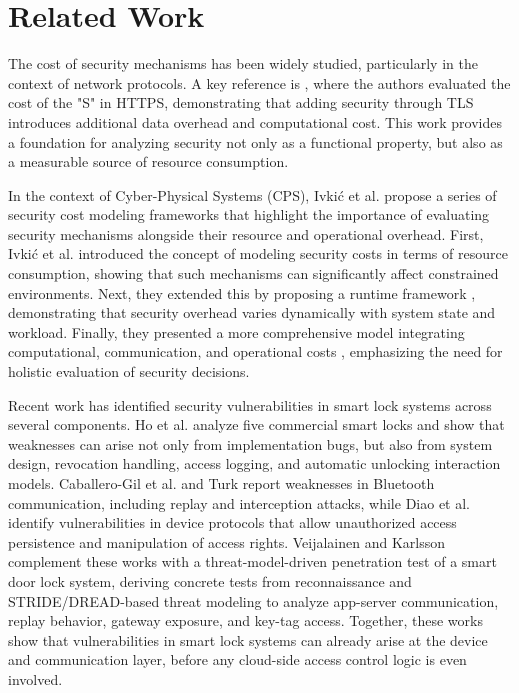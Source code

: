 \section{Related Work}

The cost of security mechanisms has been widely studied, particularly in the context of network protocols. 
A key reference is \cite{naylor2014cost}, where the authors evaluated the cost of the "S" in HTTPS, demonstrating that adding security through TLS introduces additional data overhead and computational cost. This work provides a foundation for analyzing security not only as a functional property, but also as a measurable source of resource consumption.

In the context of Cyber-Physical Systems (CPS), Ivki\'c et al. \cite{ref01, ref02, ref03} propose a series of security cost modeling frameworks that highlight the importance of evaluating security mechanisms alongside their resource and operational overhead. First, Ivki\'c et al. \cite{ref01} introduced the concept of modeling security costs in terms of resource consumption, showing that such mechanisms can significantly affect constrained environments. Next, they extended this by proposing a runtime framework \cite{ref02}, demonstrating that security overhead varies dynamically with system state and workload. Finally, they presented a more comprehensive model integrating computational, communication, and operational costs \cite{ref03}, emphasizing the need for holistic evaluation of security decisions.

Recent work has identified security vulnerabilities in smart lock systems across several components. Ho et al. \cite{ho2016smartlocks} analyze five commercial smart locks and show that weaknesses can arise not only from implementation bugs, but also from system design, revocation handling, access logging, and automatic unlocking interaction models. Caballero-Gil et al. \cite{caballero2023smartlocks} and Turk \cite{turk2023smartlock} report weaknesses in Bluetooth communication, including replay and interception attacks, while Diao et al. \cite{diao2025masterlock} identify vulnerabilities in device protocols that allow unauthorized access persistence and manipulation of access rights. Veijalainen and Karlsson \cite{veijalainen2021evaluating} complement these works with a threat-model-driven penetration test of a smart door lock system, deriving concrete tests from reconnaissance and STRIDE/DREAD-based threat modeling to analyze app-server communication, replay behavior, gateway exposure, and key-tag access. Together, these works show that vulnerabilities in smart lock systems can already arise at the device and communication layer, before any cloud-side access control logic is even involved.

